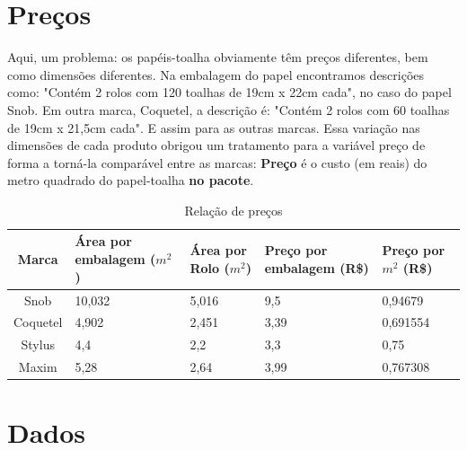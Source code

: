 \documentclass[a4paper,12pt,notitlepage]{article}
\begin{document}
\section{Preços}
Aqui, um problema: os papéis-toalha obviamente têm preços diferentes, bem como dimensões diferentes. Na embalagem do papel encontramos descrições como: "Contém 2 rolos com 120 toalhas de 19cm x 22cm cada", no caso do papel Snob. Em outra marca, Coquetel, a descrição é: "Contém 2 rolos com 60 toalhas de 19cm x 21,5cm cada". E assim para as outras marcas. Essa variação nas dimensões de cada produto obrigou um tratamento para a variável preço de forma a torná-la comparável entre as marcas: \textbf{Preço} é o custo (em reais) do metro quadrado do papel-toalha \textbf{no pacote}. 

\begin{table}
    \begin{tabular}[!htb]{c||p{30mm}|p{25mm}|p{25mm}|p{28mm}}
        Marca & Área por embalagem ($m^2$) & Área por Rolo ($m^2$) & Preço por embalagem (R\$) & Preço por $m^2$ (R\$) \\\hline\hline
         Snob&10,032&5,016&9,5&0,94679\\
         Coquetel&4,902&2,451&3,39&0,691554\\
         Stylus&4,4&2,2&3,3&0,75\\
         Maxim&5,28&2,64&3,99&0,767308\\
    \end{tabular}
    \caption{Relação de preços}\label{tabela:precos}
\end{table}
\newpage
\section{Dados}
\end{document}
